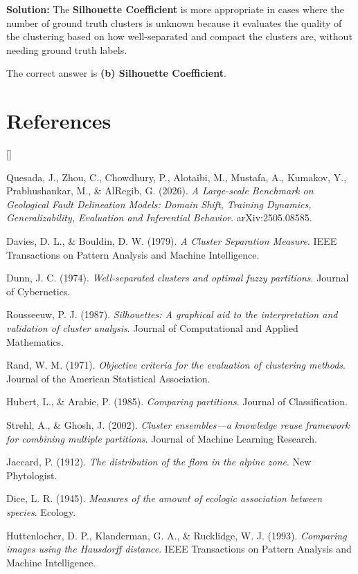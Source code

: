 \documentclass{article}
\def\beginrefs{\begin{list}
        {[\arabic{equation}]}{\usecounter{equation}
         \setlength{\leftmargin}{2.0truecm}\setlength{\labelsep}{0.4truecm}%
         \setlength{\labelwidth}{1.6truecm}}}
\def\endrefs{\end{list}}
\def\bibentry#1{\item[\hbox{[#1]}]}
\begin{document}
\begin{enumerate}
    \textbf{Solution:} \newline
    The \textbf{Silhouette Coefficient} is more appropriate in cases where the number of ground truth clusters is unknown because it evaluates the quality of the clustering based on how well-separated and compact the clusters are, without needing ground truth labels.

    The correct answer is \textbf{(b) Silhouette Coefficient}.
\end{enumerate}


\section{References}

\beginrefs

\bibentry{1} Quesada, J., Zhou, C., Chowdhury, P., Alotaibi, M., Mustafa, A., Kumakov, Y., Prabhushankar, M., \& AlRegib, G. (2026). \textit{A Large-scale Benchmark on Geological Fault Delineation Models: Domain Shift, Training Dynamics, Generalizability, Evaluation and Inferential Behavior}. arXiv:2505.08585.

\bibentry{2} Davies, D. L., \& Bouldin, D. W. (1979). \textit{A Cluster Separation Measure}. IEEE Transactions on Pattern Analysis and Machine Intelligence.

\bibentry{3} Dunn, J. C. (1974). \textit{Well-separated clusters and optimal fuzzy partitions}. Journal of Cybernetics.

\bibentry{4} Rousseeuw, P. J. (1987). \textit{Silhouettes: A graphical aid to the interpretation and validation of cluster analysis}. Journal of Computational and Applied Mathematics.

\bibentry{5} Rand, W. M. (1971). \textit{Objective criteria for the evaluation of clustering methods}. Journal of the American Statistical Association.

\bibentry{6} Hubert, L., \& Arabie, P. (1985). \textit{Comparing partitions}. Journal of Classification.

\bibentry{7} Strehl, A., \& Ghosh, J. (2002). \textit{Cluster ensembles—a knowledge reuse framework for combining multiple partitions}. Journal of Machine Learning Research.

\bibentry{8} Jaccard, P. (1912). \textit{The distribution of the flora in the alpine zone}. New Phytologist.

\bibentry{9} Dice, L. R. (1945). \textit{Measures of the amount of ecologic association between species}. Ecology.

\bibentry{10} Huttenlocher, D. P., Klanderman, G. A., \& Rucklidge, W. J. (1993). \textit{Comparing images using the Hausdorff distance}. IEEE Transactions on Pattern Analysis and Machine Intelligence.

\endrefs
\end{document}
